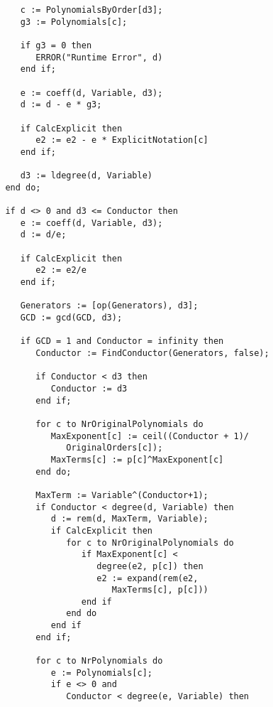 \begin{verbatim}
                  c := PolynomialsByOrder[d3];
                  g3 := Polynomials[c];

                  if g3 = 0 then
                     ERROR("Runtime Error", d)
                  end if;

                  e := coeff(d, Variable, d3);
                  d := d - e * g3;

                  if CalcExplicit then
                     e2 := e2 - e * ExplicitNotation[c]
                  end if;

                  d3 := ldegree(d, Variable)
               end do;

               if d <> 0 and d3 <= Conductor then
                  e := coeff(d, Variable, d3);
                  d := d/e;

                  if CalcExplicit then
                     e2 := e2/e
                  end if;

                  Generators := [op(Generators), d3];
                  GCD := gcd(GCD, d3);

                  if GCD = 1 and Conductor = infinity then
                     Conductor := FindConductor(Generators, false);

                     if Conductor < d3 then
                        Conductor := d3
                     end if;

                     for c to NrOriginalPolynomials do
                        MaxExponent[c] := ceil((Conductor + 1)/
                           OriginalOrders[c]);
                        MaxTerms[c] := p[c]^MaxExponent[c]
                     end do;

                     MaxTerm := Variable^(Conductor+1);
                     if Conductor < degree(d, Variable) then
                        d := rem(d, MaxTerm, Variable);
                        if CalcExplicit then
                           for c to NrOriginalPolynomials do
                              if MaxExponent[c] < 
                                 degree(e2, p[c]) then
                                 e2 := expand(rem(e2, 
                                    MaxTerms[c], p[c]))
                              end if
                           end do
                        end if
                     end if;

                     for c to NrPolynomials do
                        e := Polynomials[c];
                        if e <> 0 and 
                           Conductor < degree(e, Variable) then
                           

\end{verbatim}
